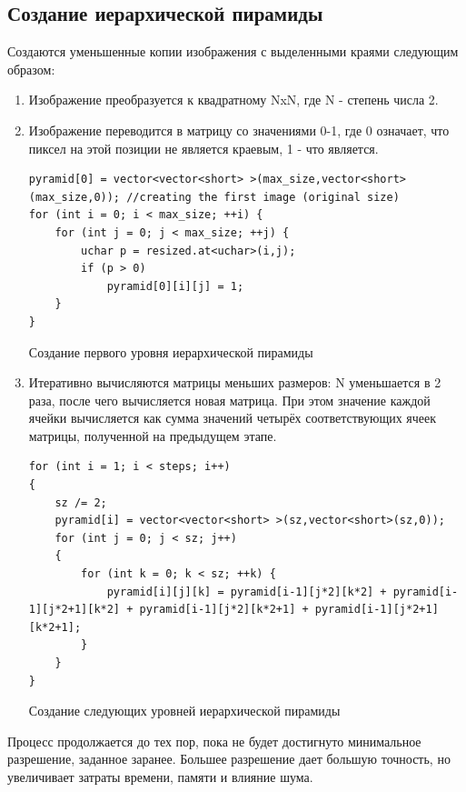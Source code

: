 \subsection{Создание иерархической пирамиды}
Создаются уменьшенные копии изображения с выделенными краями следующим образом:
\begin{enumerate}
  \item Изображение преобразуется к квадратному NxN, где N - степень числа 2.
  \item Изображение переводится в матрицу со значениями 0-1, где 0 означает, что пиксел на этой позиции не является краевым, 1 - что является.

\begin{ListingEnv}[H]
\begin{lstlisting}
pyramid[0] = vector<vector<short> >(max_size,vector<short>(max_size,0)); //creating the first image (original size)
for (int i = 0; i < max_size; ++i) {
    for (int j = 0; j < max_size; ++j) {
        uchar p = resized.at<uchar>(i,j);
        if (p > 0)
            pyramid[0][i][j] = 1;
    }
}
\end{lstlisting}
\caption{Создание первого уровня иерархической пирамиды}
\label{list:level0}
\end{ListingEnv}
\item Итеративно вычисляются матрицы меньших размеров: N уменьшается в 2 раза, после чего вычисляется новая матрица. 
При этом значение каждой ячейки вычисляется как сумма значений четырёх соответствующих ячеек матрицы, полученной на предыдущем этапе.

\begin{ListingEnv}[H]
\begin{lstlisting}
for (int i = 1; i < steps; i++)
{
    sz /= 2;
    pyramid[i] = vector<vector<short> >(sz,vector<short>(sz,0));
    for (int j = 0; j < sz; j++)
    {
        for (int k = 0; k < sz; ++k) {
            pyramid[i][j][k] = pyramid[i-1][j*2][k*2] + pyramid[i-1][j*2+1][k*2] + pyramid[i-1][j*2][k*2+1] + pyramid[i-1][j*2+1][k*2+1];
        }
    }
}
\end{lstlisting}
\caption{Создание следующих уровней иерархической пирамиды}
\label{list:otherlevels}
\end{ListingEnv}

\end{enumerate}
Процесс продолжается до тех пор, пока не будет достигнуто минимальное разрешение, заданное заранее. Большее разрешение дает большую точность, но увеличивает затраты времени, памяти и влияние шума.

